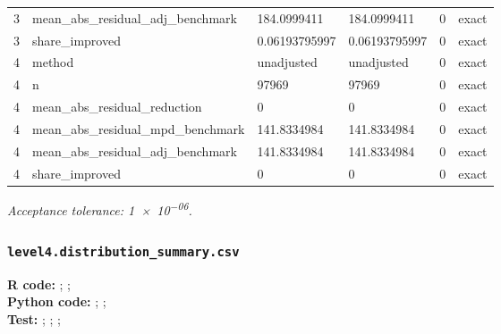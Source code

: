 \documentclass[10pt]{article}
\begin{document}
\begin{longtable}{@{}r p{}p{}p{}rl@{}}
3 & mean\_\allowbreak{}abs\_\allowbreak{}residual\_\allowbreak{}adj\_\allowbreak{}benchmark & 184.0999411 & 184.0999411 & 0 & exact \\
3 & share\_\allowbreak{}improved & 0.06193795997 & 0.06193795997 & 0 & exact \\
4 & method & unadjusted & unadjusted & 0 & exact \\
4 & n & 97969 & 97969 & 0 & exact \\
4 & mean\_\allowbreak{}abs\_\allowbreak{}residual\_\allowbreak{}reduction & 0 & 0 & 0 & exact \\
4 & mean\_\allowbreak{}abs\_\allowbreak{}residual\_\allowbreak{}mpd\_\allowbreak{}benchmark & 141.8334984 & 141.8334984 & 0 & exact \\
4 & mean\_\allowbreak{}abs\_\allowbreak{}residual\_\allowbreak{}adj\_\allowbreak{}benchmark & 141.8334984 & 141.8334984 & 0 & exact \\
4 & share\_\allowbreak{}improved & 0 & 0 & 0 & exact \\
\bottomrule
\end{longtable}
\normalsize
\textit{Acceptance tolerance: \num{1e-06}.}

\subsubsection{\texorpdfstring{\texttt{level4.distribution\_summary.csv}}{level4.distribution\_summary.csv}}
{\footnotesize \textbf{R code:} ; ; \\ \textbf{Python code:} ; ; \\ \textbf{Test:} ; ; ; \par}
\end{document}
